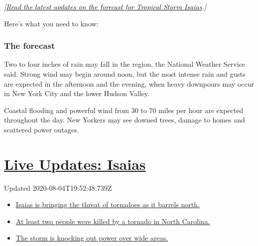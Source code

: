 \emph{{[}}\href{https://www.nytimes3xbfgragh.onion/2020/08/03/us/isaias-storm-updates.html}{\emph{Read
the latest updates on the forecast for Tropical Storm
Isaias}}\emph{.{]}}

Here's what you need to know:

\hypertarget{the-forecast}{%
\subsubsection{The forecast}\label{the-forecast}}

Two to four inches of rain may fall in the region, the National Weather
Service said. Strong wind may begin around noon, but the most intense
rain and gusts are expected in the afternoon and the evening, when heavy
downpours may occur in New York City and the lower Hudson Valley.

Coastal flooding and powerful wind from 30 to 70 miles per hour are
expected throughout the day. New Yorkers may see downed trees, damage to
homes and scattered power outages.

\hypertarget{live-updates-isaias}{%
\section{\texorpdfstring{\href{https://www.nytimes3xbfgragh.onion/2020/08/04/us/isaias-storm-updates.html?action=click\&pgtype=Article\&state=default\&region=MAIN_CONTENT_1\&context=storylines_live_updates}{Live
Updates: Isaias}}{Live Updates: Isaias}}\label{live-updates-isaias}}

Updated 2020-08-04T19:52:48.739Z

\begin{itemize}
\tightlist
\item
  \href{https://www.nytimes3xbfgragh.onion/2020/08/04/us/isaias-storm-updates.html?action=click\&pgtype=Article\&state=default\&region=MAIN_CONTENT_1\&context=storylines_live_updates\#link-362830dd}{Isaias
  is bringing the threat of tornadoes as it barrels north.}
\item
  \href{https://www.nytimes3xbfgragh.onion/2020/08/04/us/isaias-storm-updates.html?action=click\&pgtype=Article\&state=default\&region=MAIN_CONTENT_1\&context=storylines_live_updates\#link-7961bdbc}{At
  least two people were killed by a tornado in North Carolina.}
\item
  \href{https://www.nytimes3xbfgragh.onion/2020/08/04/us/isaias-storm-updates.html?action=click\&pgtype=Article\&state=default\&region=MAIN_CONTENT_1\&context=storylines_live_updates\#link-34e5d4e4}{The
  storm is knocking out power over wide areas.}
\end{itemize}

